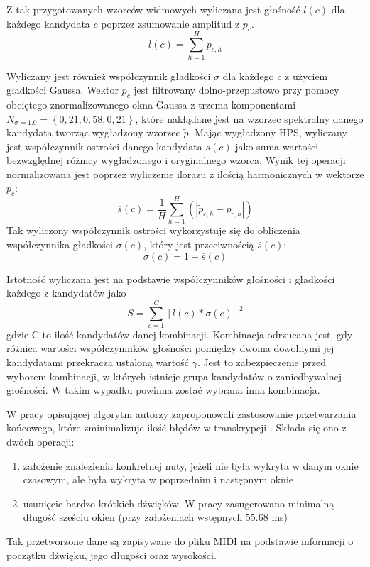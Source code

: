 \documentclass[12pt,a4paper,twoside]{mwart}
\begin{document}
Z tak przygotowanych wzorców widmowych wyliczana jest głośność $l(c)$ dla każdego kandydata $c$ poprzez zsumowanie amplitud z $p_c$.
\begin{equation}\label{eq:inharmonicity:loudness}
  l(c) = \sum_{h=1}^H p_{c,h}
\end{equation}

Wyliczany jest również współczynnik gładkości $\sigma$ dla każdego $c$ z użyciem gładkości Gaussa. Wektor $p_c$ jest filtrowany dolno-przepustowo przy pomocy obciętego znormalizowanego okna Gaussa z trzema komponentami $N_{\sigma = 1.0} = \left\{0,21, 0,58, 0,21\right\}$, które nakłądane jest na wzorzec spektralny danego kandydata tworząc wygładzony wzorzec $\widetilde{p}$. Mając wygładzony HPS, wyliczany jest współczynnik ostrości danego kandydata $s(c)$ jako suma wartości bezwzględnej różnicy wygładzonego i oryginalnego wzorca. Wynik tej operacji normalizowana jest poprzez wyliczenie ilorazu z ilością harmonicznych w wektorze $p_c$:
\begin{equation}\label{eq:inharmonicity:sharpness}
  \overline{s}(c) = \frac{1}{H}\sum_{h=1}^H \left(\left|\widetilde{p}_{c,h} - p_{c,h}\right|\right)
\end{equation}
Tak wyliczony współczynnik ostrości wykorzystuje się do obliczenia współczynnika gładkości $\sigma(c)$, który jest przeciwnością $\overline{s}(c)$:
\begin{equation}\label{eq:inharmonicity:smoothnes}
  \sigma(c) = 1 - \overline{s}(c) 
\end{equation}

Istotność wyliczana jest na podstawie współczynników głośności i gładkości każdego z kandydatów jako
\begin{equation}\label{eq:inharmonicity:salience}
  S = \sum_{c=1}^C\left[l(c)*\sigma(c)\right]^2
\end{equation}
gdzie C to ilość kandydatów danej kombinacji. Kombinacja  odrzucana jest, gdy różnica wartości współczynników głośności pomiędzy dwoma dowolnymi jej kandydatami przekracza ustaloną wartość $\gamma$. Jest to zabezpieczenie przed wyborem kombinacji, w których istnieje grupa kandydatów o zaniedbywalnej głośności. W takim wypadku powinna zostać wybrana inna kombinacja.

W pracy opisującej algorytm autorzy zaproponowali zastosowanie przetwarzania końcowego, które zminimalizuje ilość błędów w transkrypcji 
\cite[106-107]{Transcription:Pertus:Inharmonicity}
. Składa się ono z dwóch operacji:
\begin{enumerate}
  \item założenie znalezienia konkretnej nuty, jeżeli nie była wykryta w danym oknie czasowym, ale była wykryta w poprzednim i następnym oknie
  \item usunięcie bardzo krótkich dźwięków. W pracy zasugerowano minimalną długość sześciu okien (przy założeniach wstępnych 55.68 ms)
\end{enumerate}
Tak przetworzone dane są zapisywane do pliku MIDI na podstawie informacji o początku dźwięku, jego długości oraz wysokości.
\end{document}
